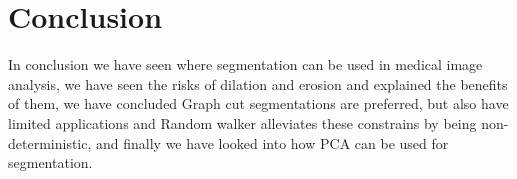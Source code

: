 \section{Conclusion}
In conclusion we have seen where segmentation can be used in medical image analysis, we have seen the risks of dilation and erosion and explained the benefits of them, we have concluded Graph cut segmentations are preferred, but also have limited applications and Random walker alleviates these constrains by being non-deterministic, and finally we have looked into how PCA can be used for segmentation.